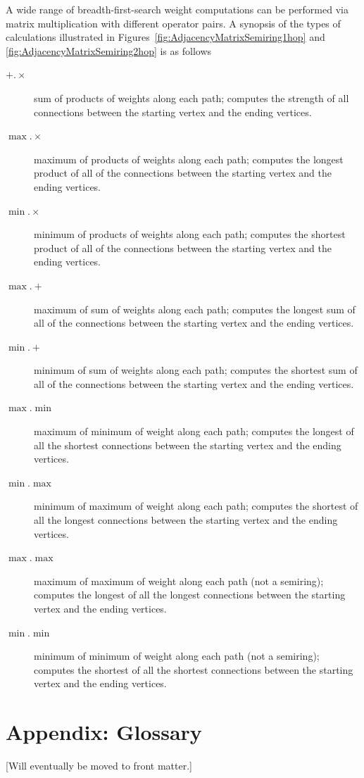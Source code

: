   A wide range of breadth-first-search weight computations can be performed via matrix multiplication with different operator pairs.  A synopsis of the types of calculations illustrated in Figures~\ref{fig:AdjacencyMatrixSemiring1hop} and \ref{fig:AdjacencyMatrixSemiring2hop} is as follows
\begin{description}
\item[${+}.{\times}$] sum of products of weights along each path; computes the strength of all connections between the starting vertex and the ending vertices.
\item[${\max}.{\times}$] maximum of products of weights along each path; computes the longest product of all of the connections between the starting vertex and the ending vertices.
\item[${\min}.{\times}$] minimum of products of weights along each path; computes the shortest product of all of the connections between the starting vertex and the ending vertices.
\item[${\max}.{+}$] maximum of sum of weights along each path; computes the longest sum of all of the connections between the starting vertex and the ending vertices.
\item[${\min}.{+}$] minimum of sum of weights along each path; computes the shortest sum of all of the connections between the starting vertex and the ending vertices.
\item[${\max}.{\min}$] maximum of minimum of weight along each path; computes the longest of all the shortest connections between the starting vertex and the ending vertices.
\item[${\min}.{\max}$] minimum of maximum of weight along each path; computes the shortest of all the longest connections between the starting vertex and the ending vertices.
\item[${\max}.{\max}$] maximum of maximum of weight along each path (not a semiring); computes the longest of all the longest connections between the starting vertex and the ending vertices.
\item[${\min}.{\min}$] minimum of minimum of weight along each path (not a semiring); computes the shortest of all the shortest connections between the starting vertex and the ending vertices.
\end{description}

\section{Appendix: Glossary}
  [Will eventually be moved to front matter.]

